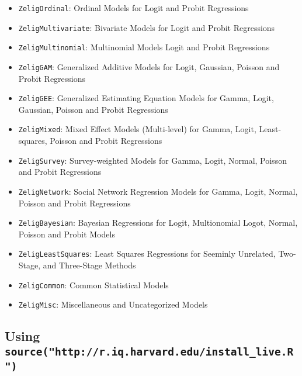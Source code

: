 \begin{itemize}

	\item {\tt ZeligOrdinal}: Ordinal Models for Logit and Probit Regressions

	\item {\tt ZeligMultivariate}: Bivariate Models for Logit and Probit Regressions

	\item {\tt ZeligMultinomial}: Multinomial Models Logit and Probit Regressions
	
	\item {\tt ZeligGAM}: Generalized Additive Models for Logit, Gaussian, Poisson and Probit Regressions

	\item {\tt ZeligGEE}: Generalized Estimating Equation Models for Gamma, Logit, Gaussian, Poisson and Probit Regressions
	
	\item {\tt ZeligMixed}: Mixed Effect Models (Multi-level) for Gamma, Logit, Least-squares, Poisson and Probit Regressions
	
	\item {\tt ZeligSurvey}: Survey-weighted Models for Gamma, Logit, Normal, Poisson and Probit Regressions

	\item {\tt ZeligNetwork}: Social Network Regression Models for Gamma, Logit, Normal, Poisson and Probit Regressions

	\item {\tt ZeligBayesian}: Bayesian Regressions for Logit, Multionomial Logot, Normal, Poisson and Probit Models

	\item {\tt ZeligLeastSquares}: Least Squares Regressions for Seeminly Unrelated, Two-Stage, and Three-Stage Methods

	\item {\tt ZeligCommon}: Common Statistical Models

	\item {\tt ZeligMisc}: Miscellaneous and Uncategorized Models

\end{itemize}


\subsection{Using {\tt source("http://r.iq.harvard.edu/install\_live.R")}}







